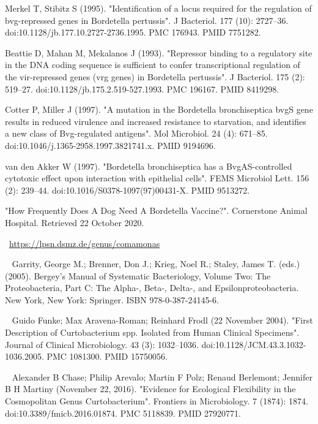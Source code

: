 \documentclass[11pt]{article}
\begin{document}
\begin{thebibliography}{3}
	 Merkel T, Stibitz S (1995). "Identification of a locus required for the regulation of bvg-repressed genes in Bordetella pertussis". J Bacteriol. 177 (10): 2727–36. doi:10.1128/jb.177.10.2727-2736.1995. PMC 176943. PMID 7751282.
	
	Beattie D, Mahan M, Mekalanos J (1993). "Repressor binding to a regulatory site in the DNA coding sequence is sufficient to confer transcriptional regulation of the vir-repressed genes (vrg genes) in Bordetella pertussis". J Bacteriol. 175 (2): 519–27. doi:10.1128/jb.175.2.519-527.1993. PMC 196167. PMID 8419298.
	
	 Cotter P, Miller J (1997). "A mutation in the Bordetella bronchiseptica bvgS gene results in reduced virulence and increased resistance to starvation, and identifies a new class of Bvg-regulated antigens". Mol Microbiol. 24 (4): 671–85. doi:10.1046/j.1365-2958.1997.3821741.x. PMID 9194696.
	
	 van den Akker W (1997). "Bordetella bronchiseptica has a BvgAS-controlled cytotoxic effect upon interaction with epithelial cells". FEMS Microbiol Lett. 156 (2): 239–44. doi:10.1016/S0378-1097(97)00431-X. PMID 9513272.
	
	 "How Frequently Does A Dog Need A Bordetella Vaccine?". Cornerstone Animal Hospital. Retrieved 22 October 2020.
	
	 ~\url{https://lpsn.dsmz.de/genus/comamonas}
	
	~ Garrity, George M.; Brenner, Don J.; Krieg, Noel R.; Staley, James T. (eds.) (2005). Bergey's Manual of Systematic Bacteriology, Volume Two: The Proteobacteria, Part C: The Alpha-, Beta-, Delta-, and Epsilonproteobacteria. New York, New York: Springer. ISBN 978-0-387-24145-6.
	 
	~ Guido Funke; Max Aravena-Roman; Reinhard Frodl (22 November 2004). "First Description of Curtobacterium spp. Isolated from Human Clinical Specimens". Journal of Clinical Microbiology. 43 (3): 1032–1036. doi:10.1128/JCM.43.3.1032-1036.2005. PMC 1081300. PMID 15750056.
	
	~ Alexander B Chase; Philip Arevalo; Martin F Polz; Renaud Berlemont; Jennifer B H Martiny (November 22, 2016). "Evidence for Ecological Flexibility in the Cosmopolitan Genus Curtobacterium". Frontiers in Microbiology. 7 (1874): 1874. doi:10.3389/fmicb.2016.01874. PMC 5118839. PMID 27920771.
	

\end{thebibliography}
\end{document}
